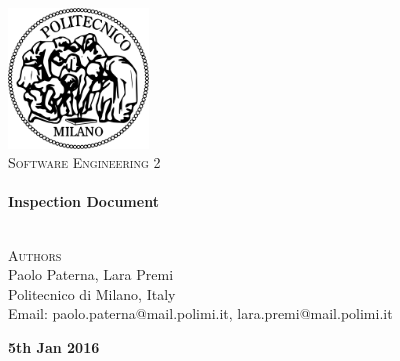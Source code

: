 \begin{titlepage}
\begin{center}


~\\[1cm]
\includegraphics[width=0.28\textwidth]{./images/logo-polimi}~\\[1.5cm]

\textsc{\huge \textsc{Software Engineering 2}
}
\\[1cm]

\HRule \\[0.4cm]
{ \huge \bfseries Inspection Document\\[0.3cm]
		}
\HRule \\[1.5cm]

\noindent
\begin{minipage}{1.0\textwidth}
\begin{center}


\textsc{\large{Authors}} \\
\large{
Paolo Paterna, Lara Premi \\
\vspace{0.8cm}
\small{
Politecnico di Milano, Italy\\
Email: paolo.paterna@mail.polimi.it, lara.premi@mail.polimi.it
}
}

\end{center}
\end{minipage}%

\vfill
\textbf{\large{5th Jan 2016}}

\end{center}
\end{titlepage}